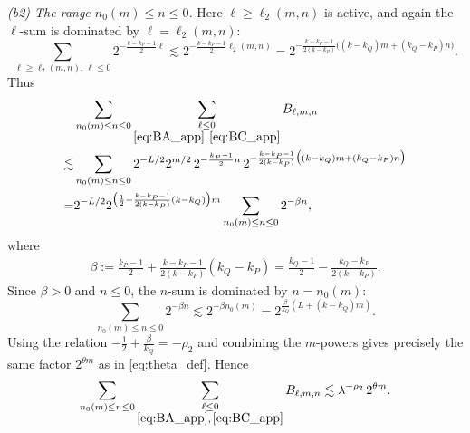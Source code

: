 \documentclass[10pt]{amsart}
\numberwithin{equation}{section}
\theoremstyle{definition}
\theoremstyle{remark}
\theoremstyle{remark}
\begin{document}
	\smallskip
	\noindent\emph{(b2) The range $n_0(m)\le n\le 0$.}
	Here $\ell\ge \ell_2(m,n)$ is active, and again the $\ell$-sum is dominated by $\ell=\ell_2(m,n)$:
	\[
	\sum_{\ell\ge \ell_2(m,n),\,\ell\le 0}
	2^{-\frac{k-k_P-1}{2}\ell}
	\lesssim
	2^{-\frac{k-k_P-1}{2}\ell_2(m,n)}
	=
	2^{-\frac{k-k_P-1}{2(k-k_P)}
		\bigl((k-k_Q)m+(k_Q-k_P)n\bigr)}.
	\]
	Thus
	\begin{align*}
		&\sum_{n_0(m)\le n\le 0}
		\sum_{\substack{\ell\le 0\\ \eqref{eq:BA_app},\,\eqref{eq:BC_app}}}
		B_{\ell,m,n}\\
		\lesssim
		&\sum_{n_0(m)\le n\le 0}
		2^{-L/2}2^{m/2}\,
		2^{-\frac{k_P-1}{2}n}\,
		2^{-\frac{k-k_P-1}{2(k-k_P)}
			\bigl((k-k_Q)m+(k_Q-k_P)n\bigr)}\\
		=
		&2^{-L/2}
		2^{\bigl(\frac12-\frac{k-k_P-1}{2(k-k_P)}(k-k_Q)\bigr)m}
		\sum_{n_0(m)\le n\le 0}
		2^{-\beta n},
	\end{align*}
	where
	\begin{align}\label{eq:beta}
	\beta:=
	\frac{k_P-1}{2}
	+
	\frac{k-k_P-1}{2(k-k_P)}(k_Q-k_P)
	=
	\frac{k_Q-1}{2}
	-\frac{k_Q-k_P}{2(k-k_P)}.
	\end{align}
	Since $\beta>0$ and $n\le 0$, the $n$-sum is dominated by $n=n_0(m)$:
	\[
	\sum_{n_0(m)\le n\le 0}2^{-\beta n}
	\lesssim
	2^{-\beta n_0(m)}
	=
	2^{\frac{\beta}{k_Q}(L+(k-k_Q)m)}.
	\]
	Using the relation $-\frac12+\frac{\beta}{k_Q}=-\rho_2$ and combining the $m$-powers gives precisely the same factor $2^{\theta m}$ as in \eqref{eq:theta_def}. Hence
	\begin{align}\label{eq:b2}
		\sum_{n_0(m)\le n\le 0}
		\sum_{\substack{\ell\le 0\\ \eqref{eq:BA_app},\,\eqref{eq:BC_app}}}
		B_{\ell,m,n}
		\lesssim
		\lambda^{-\rho_2}\,2^{\theta m}.
	\end{align}
	
\end{document}
